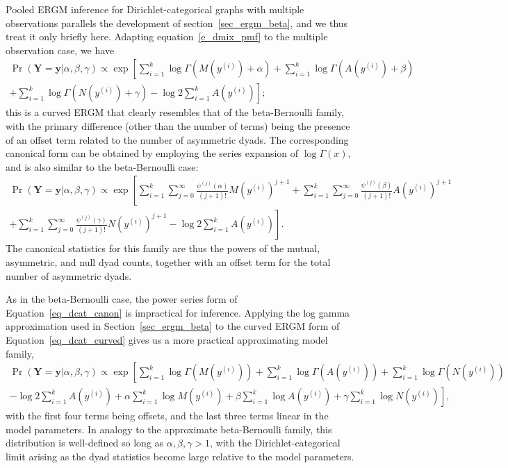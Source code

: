 \documentclass[11pt]{article}
\begin{document}
Pooled ERGM inference for Dirichlet-categorical graphs with multiple observations parallels the development of section~\ref{sec_ergm_beta}, and we thus treat it only briefly here.  Adapting equation~\ref{e_dmix_pmf} to the multiple observation case, we have 
\begin{multline}
\Pr(\mathbf{Y}=\mathbf{y}|\alpha,\beta,\gamma) \propto \exp\left[ \sum_{i=1}^k \log \Gamma\left(M\left(y^{(i)}\right)+\alpha\right) + \sum_{i=1}^k \log \Gamma\left(A\left(y^{(i)}\right)+\beta\right) \right. \\
\left. + \sum_{i=1}^k \log \Gamma\left(N\left(y^{(i)}\right)+\gamma\right) - \log 2 \sum_{i=1}^k A\left(y^{(i)}\right)  \right]; \label{eq_dcat_curved}
\end{multline}
this is a curved ERGM that clearly resembles that of the beta-Bernoulli family, with the primary difference (other than the number of terms) being the presence of an offset term related to the number of asymmetric dyads.  The corresponding canonical form can be obtained by employing the series expansion of $\log\Gamma(x)$, and is also similar to the beta-Bernoulli case:
\begin{multline}
\Pr(\mathbf{Y}=\mathbf{y}|\alpha,\beta,\gamma) \propto \exp\left[ \sum_{i=1}^k \sum_{j=0}^\infty \frac{\psi^{(j)}(\alpha)}{(j+1)!} M\left(y^{(i)}\right)^{j+1} + \sum_{i=1}^k \sum_{j=0}^\infty \frac{\psi^{(j)}(\beta)}{(j+1)!} A\left(y^{(i)}\right)^{j+1} \right.\\
\left.+ \sum_{i=1}^k \sum_{j=0}^\infty \frac{\psi^{(j)}(\gamma)}{(j+1)!} N\left(y^{(i)}\right)^{j+1} - \log 2 \sum_{i=1}^k A\left(y^{(i)}\right) \right]. \label{eq_dcat_canon}
\end{multline}
The canonical statistics for this family are thus the powers of the mutual, asymmetric, and null dyad counts, together with an offset term for the total number of asymmetric dyads.

As in the beta-Bernoulli case, the power series form of Equation~\ref{eq_dcat_canon} is impractical for inference.  Applying the log gamma approximation used in Section~\ref{sec_ergm_beta} to the curved ERGM form of Equation~\ref{eq_dcat_curved} gives us a more practical approximating model family,
\begin{multline}
\Pr(\mathbf{Y}=\mathbf{y}|\alpha,\beta,\gamma) \propto \exp\left[ \sum_{i=1}^k \log \Gamma\left(M\left(y^{(i)}\right)\right) + \sum_{i=1}^k \log \Gamma\left(A\left(y^{(i)}\right)\right) + \sum_{i=1}^k \log \Gamma\left(N\left(y^{(i)}\right)\right) \right. \\
\left. - \log 2 \sum_{i=1}^k A\left(y^{(i)}\right)+ \alpha \sum_{i=1}^k  \log M\left(y^{(i)}\right) + \beta \sum_{i=1}^k \log A\left(y^{(i)}\right) + \gamma \sum_{i=1}^k \log N\left(y^{(i)}\right)   \right], \label{eq_dcat_apx}
\end{multline}
\noindent
with the first four terms being offsets, and the last three terms linear in the model parameters.  In analogy to the approximate beta-Bernoulli family, this distribution is well-defined so long as $\alpha,\beta,\gamma>1$, with the Dirichlet-categorical limit arising as the dyad statistics become large relative to the model parameters.
\end{document}
